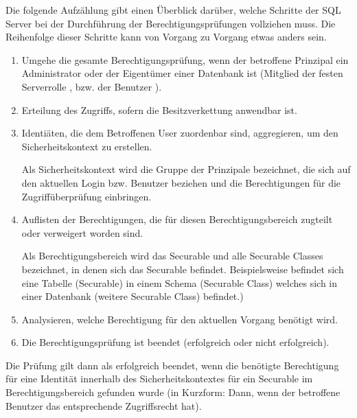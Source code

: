           Die folgende Aufzählung gibt einen Überblick darüber, welche Schritte
          der SQL Server bei der Durchführung der Berechtigungsprüfungen
          vollziehen muss. Die Reihenfolge dieser Schritte kann von Vorgang zu
          Vorgang etwas anders sein.
          \begin{enumerate}
            \item Umgehe die gesamte Berechtigungsprüfung, wenn der betroffene
            Prinzipal ein Administrator oder der Eigentümer einer Datenbank ist
            (Mitglied der festen Serverrolle , bzw. der
            Benutzer ).
            \item Erteilung des Zugriffs, sofern die Besitzverkettung anwendbar
            ist.
            \item Identiäten, die dem Betroffenen User zuordenbar sind,
            aggregieren, um den Sicherheitskontext zu erstellen.
            \begin{merke}
              Als Sicherheitskontext wird die Gruppe der Prinzipale bezeichnet,
              die sich auf den aktuellen Login bzw. Benutzer beziehen und die
              Berechtigungen für die Zugriffüberprüfung einbringen. 
            \end{merke}
            \item Auflisten der Berechtigungen, die für diesen
            Berechtigungsbereich zugteilt oder verweigert worden sind.
            \begin{merke}
              Als Berechtigungsbereich wird das Securable und alle Securable
              Classes bezeichnet, in denen sich das Securable befindet.
              Beispielsweise befindet sich eine Tabelle (Securable) in einem
              Schema (Securable Class) welches sich in einer Datenbank
              (weitere Securable Class) befindet.)
            \end{merke}
            \item Analysieren, welche Berechtigung für den aktuellen Vorgang
            benötigt wird.
            \item Die Berechtigungsprüfung ist beendet (erfolgreich oder nicht
            erfolgreich).
          \end{enumerate}
          Die Prüfung gilt dann als erfolgreich beendet, wenn die benötigte
          Berechtigung für eine Identität innerhalb des Sicherheitskontextes für
          ein Securable im Berechtigungsbereich gefunden wurde (in Kurzform:
          Dann, wenn der betroffene Benutzer das entsprechende Zugriffsrecht
          hat).
